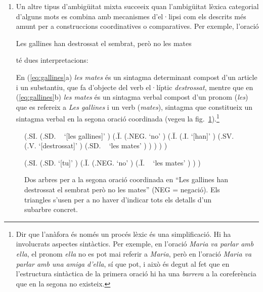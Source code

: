 \begin{enumerate}
  \item Un altre tipus d'ambigüitat mixta succeeix quan l'ambigüitat
    lèxica categorial d'alguns mots es combina amb mecanismes
    d'el·lipsi com els descrits més amunt per a construccions
    coordinatives o comparatives.  Per exemple, l'oració
    \begin{exemple}
      Les gallines han destrossat el sembrat, però no les mates
    \end{exemple}
    té dues interpretacions:
    En (\ref{eq:gallines}a) \emph{les mates} és un sintagma
    determinant compost d'un article i un substantiu, que fa d'objecte
    del verb el·líptic \emph{destrossat}, mentre que en
    (\ref{eq:gallines}b) \emph{les mates} és un sintagma verbal
    compost d'un pronom ({\em les}) que es refereix a \emph{Les
      gallines} i un verb ({\em mates}), sintagma que constitueix un
    sintagma verbal en la segona oració coordinada (vegeu la
    fig.~\ref{fg:mates}).\footnote{Dir que l'anàfora és només un
      procés lèxic és una simplificació. Hi ha involucrats aspectes
      sintàctics. Per exemple, en l'oració \emph{Maria va parlar amb
        ella}, el pronom \emph{ella} no es pot mai referir a
      \emph{Maria}, però en l'oració \emph{Maria va parlar amb una
        amiga d'ella}, sí que pot, i això és degut al fet que en
      l'estructura sintàctica de la primera oració hi ha una
      \emph{barrera} a la coreferència que en la segona no existeix.}
\end{enumerate}

\begin{figure}
\begin{center}
\begin{parsetree}
(.SI. (.SD. ~ `[les gallines]' ) (.{\={I}}. (.NEG. `no' )
(.{\={I}}. (.I. `[han]' ) (.SV. (.V. `[destrossat]' )  (.SD. ~ `les
mates' ) ) ) ) ) 
\end{parsetree}
\end{center}
\begin{center}
\begin{parsetree}
(.SI. (.SD. `[tu]' ) (.{\={I}}. (.NEG. `no' ) (.{\={I}}. ~ `les mates'
) ) )
\end{parsetree}
\end{center}
\caption{Dos arbres per a la segona oració coordinada en ``Les
  gallines han destrossat el sembrat però no les mates'' (NEG =
  negació). Els triangles s'usen per a no haver d'indicar tots els
  detalls d'un subarbre concret.}
\label{fg:mates}
\end{figure}

